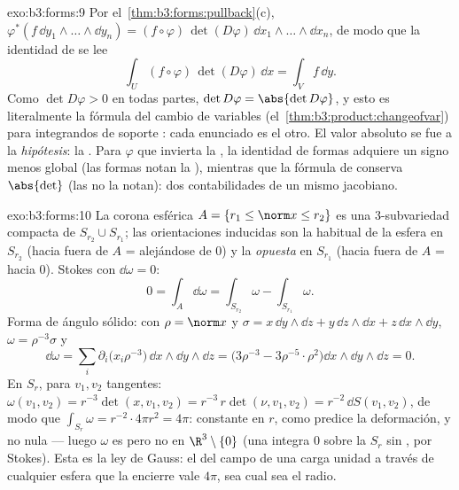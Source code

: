 \begin{solution}{exo:b3:forms:9}
Por el~\cref{thm:b3:forms:pullback}(c),
$\varphi^*(f\,\dd y_1\wedge\dots\wedge\dd y_n) =
(f\circ\varphi)\,\det(D\varphi)\,\dd
x_1\wedge\dots\wedge\dd x_n$, de modo que la identidad de
 se lee
\[
\int_U(f\circ\varphi)\,\det(D\varphi)\,\dd x = \int_Vf\,\dd
y .
\]
Como $\det D\varphi > 0$ en todas partes, $\det D\varphi =
\abs{\det D\varphi}$, y esto es literalmente la fórmula del cambio de
variables (el~\cref{thm:b3:product:changeofvar}) para integrandos
 de soporte : cada
enunciado es el otro. El valor absoluto se fue a la \emph{hipótesis}: la
. Para $\varphi$ que
invierta la , la identidad de formas adquiere un signo menos
global (las formas notan la
), mientras que la fórmula
de  conserva $\abs{\det}$ (las
 no la notan): dos
contabilidades de un mismo jacobiano.
\end{solution}

\begin{solution}{exo:b3:forms:10}
La corona esférica $A = \{r_1 \leq \norm x \leq r_2\}$ es una
$3$-subvariedad compacta de
 $S_{r_2}\cup S_{r_1}$; las
orientaciones inducidas son la
 habitual de la esfera en
$S_{r_2}$ (hacia fuera de $A$ = alejándose de $0$) y la \emph{opuesta}
en $S_{r_1}$ (hacia fuera de $A$ = hacia $0$). Stokes con
$\dd\omega = 0$:
\[
0 = \int_A\dd\omega = \int_{S_{r_2}}\omega -
\int_{S_{r_1}}\omega .
\]
Forma de ángulo sólido: con $\rho = \norm x$ y $\sigma =
x\,\dd y\wedge\dd z + y\,\dd z\wedge\dd x + z\,\dd
x\wedge\dd y$, $\omega = \rho^{-3}\sigma$ y
\[
\dd\omega = \sum_i\partial_i\bigl(x_i\rho^{-3}\bigr)\,
\dd x\wedge\dd y\wedge\dd z
= \bigl(3\rho^{-3} - 3\rho^{-5}\cdot\rho^2\bigr)\dd
x\wedge\dd y\wedge\dd z = 0 .
\]
En $S_r$, para $v_1, v_2$ tangentes: $\omega(v_1, v_2) =
r^{-3}\det(x, v_1, v_2) = r^{-3}\,r\det(\nu, v_1, v_2) =
r^{-2}\,\dd S(v_1, v_2)$, de modo que $\int_{S_r}\omega =
r^{-2}\cdot4\pi r^2 = 4\pi$: constante en $r$, como predice la
deformación, y no nula --- luego $\omega$ es
 pero no
 en $\R^3\setminus\{0\}$ (una
 integra $0$ sobre la
$S_r$ sin , por Stokes). Esta es la ley de Gauss: el  del
campo de una carga unidad a través de cualquier esfera que la encierre
vale $4\pi$, sea cual sea el radio.
\end{solution}


